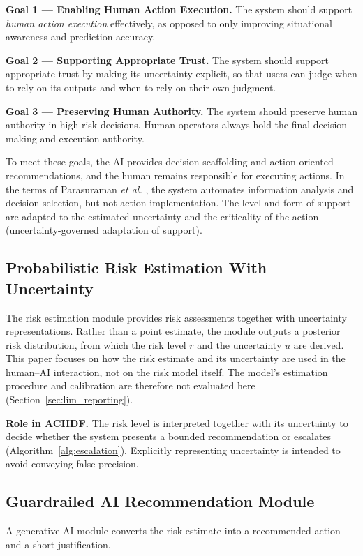\documentclass[journal]{IEEEtran}
\theoremstyle{plain}
\theoremstyle{definition}
\begin{document}
    \textbf{Goal 1 --- Enabling Human Action Execution.}
    The system should support \emph{human action execution} effectively, as opposed to only improving situational awareness and prediction accuracy.

    \textbf{Goal 2 --- Supporting Appropriate Trust.}
    The system should support appropriate trust \cite{Lee2004} by making its uncertainty explicit, so that users can judge when to rely on its outputs and when to rely on their own judgment.

    \textbf{Goal 3 --- Preserving Human Authority.}
    The system should preserve human authority in high-risk decisions. Human operators always hold the final decision-making and execution authority.

    To meet these goals, the AI provides decision scaffolding and action-oriented recommendations, and the human remains responsible for executing actions. In the terms of Parasuraman \emph{et al.} \cite{Parasuraman2000LOA}, the system automates information analysis and decision selection, but not action implementation. The level and form of support are adapted to the estimated uncertainty and the criticality of the action (uncertainty-governed adaptation of support).

    \subsection{Probabilistic Risk Estimation With Uncertainty}
    \label{sec:risk}
    The risk estimation module provides risk assessments together with uncertainty representations. Rather than a point estimate, the module outputs a posterior risk distribution, from which the risk level $r$ and the uncertainty $u$ are derived.
    This paper focuses on how the risk estimate and its uncertainty are used in the human--AI interaction, not on the risk model itself. The model's estimation procedure and calibration are therefore not evaluated here (Section~\ref{sec:lim_reporting}).

    \textbf{Role in ACHDF.}
    The risk level is interpreted together with its uncertainty to decide whether the system presents a bounded recommendation or escalates (Algorithm~\ref{alg:escalation}). Explicitly representing uncertainty is intended to avoid conveying false precision.

    \subsection{Guardrailed AI Recommendation Module}
    \label{sec:guardrails}
    A generative AI module converts the risk estimate into a recommended action and a short justification.
\end{document}
